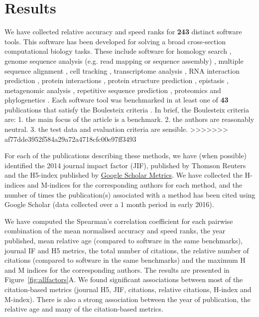 \documentclass[fleqn,10pt]{SelfArx} %
\begin{document}
\section*{Results}
We have collected relative accuracy and speed ranks for \textbf{{\color{red}243}} distinct software tools. This software has been developed for solving a broad cross-section computational biology tasks. These include software for homology search \cite{Freyhult2007-et}, genome sequence analysis (e.g. read mapping or sequence assembly) \cite{Junemann2014-mb,Tran2014-pe,Zhang2011-nd,Abbas2014-gu,Bao2011-lv,Caboche2014-lj,Kleftogiannis2013-wi,Hatem2013-cs,Schbath2012-ob,Ruffalo2011-rl,Yang2013-aj,Holtgrewe2011-fd,Rackham2015-ag,Huang2015-wu}, multiple sequence alignment \cite{Thompson2011-rf,Nuin2006-nk,Pais2014-sr,Pervez2014-zp,Liu2010-rp}, cell tracking \cite{Maska2014-ak}, transcriptome analysis \cite{Li2012-wr,Lu2013-fs,Liu2014-kz,Kumar2016-xz}, RNA interaction prediction \cite{Pain2015-gr}, protein interactions \cite{Tikk2010-qd}, protein structure prediction \cite{Kolodny2005-ry,Wallner2005-qi}, epistasis \cite{Shang2011-vy},  metagenomic analysis \cite{Lindgreen2016-tt,Bazinet2012-wf}, repetitive sequence prediction \cite{Saha2008-kd}, proteomics \cite{Lange2008-pt,Yang2009-oc} and phylogenetics \cite{Liu2011-pz,Yang2011-dv,Oscamou2008-md,Bayzid2013-hc,Liu2009-lx}. Each software tool was benchmarked in at least one of \textbf{{\color{red}43}} publications that satisfy the Boulesteix criteria \cite{Boulesteix2013-vb}. In brief, the Boulesteix criteria are: 1. the main focus of the article is a benchmark. 2. the authors are reasonably neutral. 3. the test data and evaluation criteria are sensible.
>>>>>>> af77dde3952f584a29a72a4718cfc00e97ff3493

For each of the publications describing these methods, we have (when possible) identified the 2014 journal impact factor (JIF), published by Thomson Reuters \cite{Garfield2006-lv} and the H5-index published by \href{https://scholar.google.co.nz/citations?view_op=top_venues&hl=en}{Google Scholar Metrics}. We have collected the H-indices and M-indices \cite{Hirsch2005-mt} for the corresponding authors for each method, and the number of times the publication(s) associated with a method has been cited using Google Scholar (data collected over a 1 month period in early 2016).

We have computed the Spearman’s correlation coefficient for each pairwise combination of the mean normalised accuracy and speed ranks, the year published, mean relative age (compared to software in the same benchmarks), journal IF and H5 metrics, the total number of citations, the relative number of citations (compared to software in the same benchmarks) and the maximum H and M indices for the corresponding authors. The results are presented in Figure~\ref{fig:allfactors}A. We found significant associations between most of the citation-based metrics (journal H5, JIF, citations, relative citations, H-index and M-index). There is also a strong association between the year of publication, the relative age and many of the citation-based metrics.
\end{document}
